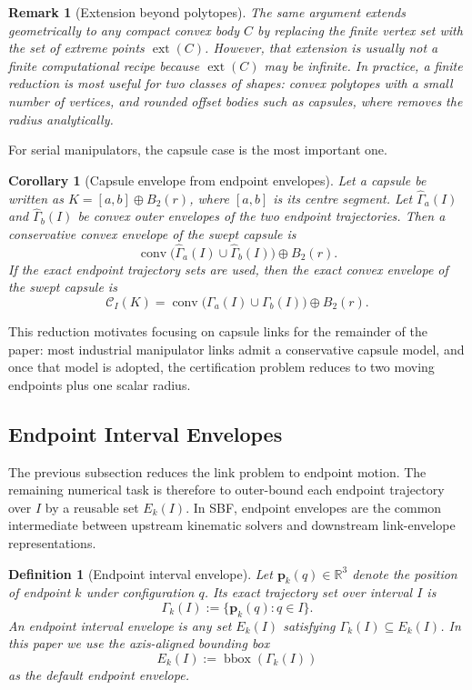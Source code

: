 \documentclass[journal]{IEEEtran}
\DeclareRobustCommand{\textsc}[1]{\textnormal{\MakeUppercase{#1}}}
\newtheorem{definition}{Definition}
\newtheorem{remark}{Remark}
\newtheorem{corollary}{Corollary}
\newcommand{\sbf}{\textsc{SBF}}
\newcommand{\Real}{\ensuremath{\mathbb{R}}}
\begin{document}
\begin{remark}[Extension beyond polytopes]\label{rem:general_convex}
The same argument extends geometrically to any compact convex body $C$ by
replacing the finite vertex set with the set of extreme points
$\operatorname{ext}(C)$. However, that extension is usually not a finite
computational recipe because $\operatorname{ext}(C)$ may be infinite. In
practice, a finite reduction is most useful for two classes of shapes: convex
polytopes with a small number of vertices, and rounded offset bodies such as
capsules, where  removes the radius analytically.
\end{remark}

For serial manipulators, the capsule case is the most important one.

\begin{corollary}[Capsule envelope from endpoint envelopes]
\label{cor:capsule_lift}
Let a capsule be written as $K=[a,b]\oplus B_2(r)$, where $[a,b]$ is its centre
segment. Let $\widehat{\Gamma}_a(I)$ and $\widehat{\Gamma}_b(I)$ be convex outer
envelopes of the two endpoint trajectories. Then a conservative convex envelope
of the swept capsule is
\[
\operatorname{conv}\bigl(\widehat{\Gamma}_a(I) \cup
\widehat{\Gamma}_b(I)\bigr) \oplus B_2(r).
\]
If the exact endpoint trajectory sets are used, then the exact convex envelope
of the swept capsule is
\[
\mathcal{C}_I(K)
= \operatorname{conv}\bigl(\Gamma_a(I) \cup \Gamma_b(I)\bigr)
\oplus B_2(r).
\]
\end{corollary}

  This reduction motivates focusing on capsule links for the remainder of the
  paper: most industrial manipulator links admit a conservative capsule model,
  and once that model is adopted, the certification problem reduces to two
  moving endpoints plus one scalar radius.

\subsection{Endpoint Interval Envelopes}\label{sec:rewrite_endpoint_env}

The previous subsection reduces the link problem to endpoint motion. The
remaining numerical task is therefore to outer-bound each endpoint trajectory
over $I$ by a reusable set $E_k(I)$. In \sbf{}, endpoint envelopes are the
common intermediate between upstream kinematic solvers and downstream
link-envelope representations.

\begin{definition}[Endpoint interval envelope]\label{def:endpoint_env}
Let $\bm{p}_k(q) \in \Real^3$ denote the position of endpoint $k$ under
configuration $q$. Its exact trajectory set over interval $I$ is
\[
\Gamma_k(I) := \{\bm{p}_k(q) : q\in I\}.
\]
An endpoint interval envelope is any set $E_k(I)$ satisfying
$\Gamma_k(I) \subseteq E_k(I)$. In this paper we use the axis-aligned bounding
box
\[
E_k(I) := \operatorname{bbox}(\Gamma_k(I))
\]
as the default endpoint envelope.
\end{definition}
\end{document}
